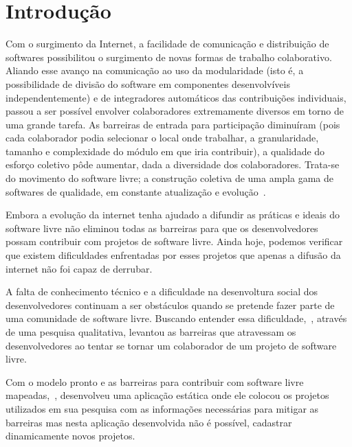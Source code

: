 \chapter{Introdução}

Com o surgimento da Internet, a facilidade de comunicação e distribuição de 
softwares possibilitou o surgimento de novas formas de trabalho colaborativo.
Aliando esse avanço na comunicação ao uso da modularidade (isto é, a possibilidade 
de divisão do software em componentes desenvolvíveis independentemente) e de 
integradores automáticos das contribuições individuais, passou a ser possível 
envolver colaboradores extremamente diversos em torno de uma grande tarefa. 
As barreiras de entrada para participação diminuíram (pois cada colaborador podia 
selecionar o local onde trabalhar, a granularidade, tamanho e complexidade do módulo 
em que iria contribuir), a qualidade do esforço coletivo pôde aumentar, dada a 
diversidade dos colaboradores. Trata-se do movimento do software livre; 
a construção coletiva de uma ampla gama de softwares de qualidade, em constante 
atualização e evolução~\cite{simon2010rossio}.

Embora a evolução da internet tenha ajudado a difundir as práticas e ideais do
software livre não eliminou todas as barreiras para que os desenvolvedores possam
contribuir com projetos de software livre. Ainda hoje, podemos verificar que 
existem dificuldades enfrentadas por esses projetos que apenas a difusão da internet 
não foi capaz de derrubar.

A falta de conhecimento técnico e a dificuldade na desenvoltura social dos desenvolvedores
continuam a ser obstáculos quando se pretende fazer parte de uma comunidade de software
livre. Buscando entender essa dificuldade,~, 
através de uma pesquisa qualitativa, levantou as barreiras que atravessam os desenvolvedores 
ao tentar se tornar um colaborador de um projeto de software livre.

Com o modelo pronto e as barreiras para contribuir com software livre mapeadas,~,
desenvolveu uma aplicação estática onde ele colocou os projetos 
utilizados em sua pesquisa com as informações necessárias para mitigar as barreiras
mas nesta aplicação desenvolvida não é possível, cadastrar dinamicamente novos projetos.

